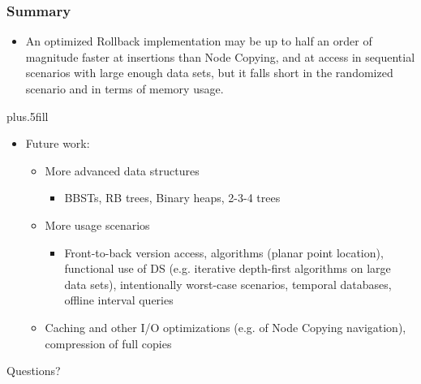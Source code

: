 \documentclass[compress]{beamer}
\begin{document}
\begin{frame}
\frametitle<presentation>{Summary}

\begin{itemize}

  \item An optimized Rollback implementation may be up to half an order of
  magnitude faster at insertions than Node Copying, and at access in sequential
  scenarios with large enough data sets, but it falls short in the randomized
  scenario and in terms of memory usage.

\end{itemize}

\pause

\vskip0pt plus.5fill
\begin{itemize}
  \item Future work:
  \begin{itemize}

    \item More advanced data structures

    \begin{itemize}

      \item BBSTs, RB trees, Binary heaps, 2-3-4 trees

    \end{itemize}

\pause
    \item More usage scenarios

    \begin{itemize}

      \item Front-to-back version access, algorithms (planar point location),
      functional use of DS (e.g. iterative depth-first algorithms on large data
      sets), intentionally worst-case scenarios, temporal databases, offline
      interval queries

    \end{itemize}

\pause
    \item Caching and other I/O optimizations (e.g. of Node Copying navigation),
    compression of full copies

  \end{itemize}
\end{itemize}
\end{frame}

\bgroup
{}
\begin{frame}[plain]{}
\center
\Huge
Questions?
\end{frame}
\egroup
\end{document}
